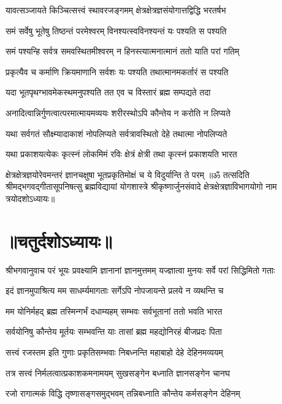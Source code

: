 \twolineshloka
{यावत्सञ्जायते किञ्चित्सत्त्वं स्थावरजङ्गमम्}
{क्षेत्रक्षेत्रज्ञसंयोगात्तद्विद्धि भरतर्षभ}%

\twolineshloka
{समं सर्वेषु भूतेषु तिष्ठन्तं परमेश्वरम्}
{विनश्यत्स्वविनश्यन्तं यः पश्यति स पश्यति}%

\twolineshloka
{समं पश्यन्हि सर्वत्र समवस्थितमीश्वरम्}
{न हिनस्त्यात्मनात्मानं ततो याति परां गतिम्}%

\twolineshloka
{प्रकृत्यैव च कर्माणि क्रियमाणानि सर्वशः}
{यः पश्यति तथात्मानमकर्तारं स पश्यति}%

\twolineshloka
{यदा भूतपृथग्भावमेकस्थमनुपश्यति}
{तत एव च विस्तारं ब्रह्म सम्पद्यते तदा}%

\twolineshloka
{अनादित्वान्निर्गुणत्वात्परमात्मायमव्ययः}
{शरीरस्थोऽपि कौन्तेय न करोति न लिप्यते}%

\twolineshloka
{यथा सर्वगतं सौक्ष्म्यादाकाशं नोपलिप्यते}
{सर्वत्रावस्थितो देहे तथात्मा नोपलिप्यते}%

\twolineshloka
{यथा प्रकाशयत्येकः कृत्स्नं लोकमिमं रविः}
{क्षेत्रं क्षेत्री तथा कृत्स्नं प्रकाशयति भारत}%

\twolineshloka
{क्षेत्रक्षेत्रज्ञयोरेवमन्तरं ज्ञानचक्षुषा}
{भूतप्रकृतिमोक्षं च ये विदुर्यान्ति ते परम्}%
{॥ॐ तत्सदिति श्रीमद्भगवद्गीतासूपनिषत्सु ब्रह्मविद्यायां योगशास्त्रे श्रीकृष्णार्जुनसंवादे क्षेत्रक्षेत्रज्ञाविभागयोगो नाम त्रयोदशोऽध्यायः॥}

\section{॥चतुर्दशोऽध्यायः॥}
{श्रीभगवानुवाच}
\twolineshloka
{परं भूयः प्रवक्ष्यामि ज्ञानानां ज्ञानमुत्तमम्}
{यज्ज्ञात्वा मुनयः सर्वे परां सिद्धिमितो गताः}%

\twolineshloka
{इदं ज्ञानमुपाश्रित्य मम साधर्म्यमागताः}
{सर्गेऽपि नोपजायन्ते प्रलये न व्यथन्ति च}%

\twolineshloka
{मम योनिर्महद् ब्रह्म तस्मिन्गर्भं दधाम्यहम्}
{सम्भवः सर्वभूतानां ततो भवति भारत}%

\twolineshloka
{सर्वयोनिषु कौन्तेय मूर्तयः सम्भवन्ति याः}
{तासां ब्रह्म महद्योनिरहं बीजप्रदः पिता}%

\twolineshloka
{सत्त्वं रजस्तम इति गुणाः प्रकृतिसम्भवाः}
{निबध्नन्ति महाबाहो देहे देहिनमव्ययम्}%

\twolineshloka
{तत्र सत्त्वं निर्मलत्वात्प्रकाशकमनामयम्}
{सुखसङ्गेन बध्नाति ज्ञानसङ्गेन चानघ}%

\twolineshloka
{रजो रागात्मकं विद्धि तृष्णासङ्गसमुद्भवम्}
{तन्निबध्नाति कौन्तेय कर्मसङ्गेन देहिनम्}%

